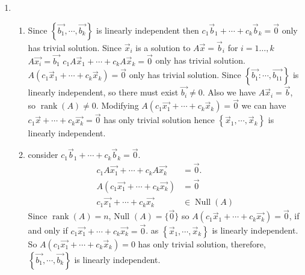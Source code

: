 \documentclass[11pt]{article}
\begin{document}
\begin{enumerate}[{\bf Q1.}]
		\item
		\begin{enumerate}
			\item 
			Since $\left\{\overrightarrow{b_1}, \cdots, \overrightarrow{b_k}\right\}$ is linearly independent then $c_1 \vec{b}_1+\cdots+c_k \vec{b}_k=\overrightarrow{0}$ only has trivial solution. Since $\vec{x}_i$ is a solution to $A \vec{x}=\vec{b}_i$ for $i=1 \ldots, k$ $A \overrightarrow{x_i}=\overrightarrow{b_1}$ \newline
			$c_1 A \vec{x}_1+\cdots+c_k A \vec{x}_k=\overrightarrow{0}$ only has trivial solution. \newline
			$A\left(c_1 \vec{x}_1+\cdots+c_k \vec{x}_k\right)=\overrightarrow{0}$ only has trivial solution. \newline
			Since $\left\{\overrightarrow{b_1}: \cdots, \overrightarrow{b_{11}}\right\}$ is linearly independent,
			so there must exist $\overrightarrow{b_i} \neq 0$. \newline
			Also we have $A \vec{x}_i=\vec{b}$, so $\operatorname{rank}(A) \neq 0$. \newline
			Modifying $A\left(c_1 \overrightarrow{x_1}+\cdots+c_k \vec{x}_k\right)=\overrightarrow{0}$ we can have
			$c_1 \vec{x}+\cdots+c_k \overrightarrow{x_k}=\overrightarrow{0}$ has only trivial solution \newline
			hence $\left\{\vec{x}_1, \cdots, \vec{x}_k\right\}$ is linearly independent.
			\item 
			consider $c_1 \vec{b}_1+\cdots+c_k \vec{b}_k=\overrightarrow{0}$.
			$$
			\begin{aligned}
			c_1 A \overrightarrow{x_1}+\cdots+c_k A \overrightarrow{x_k} & =\overrightarrow{0} . \\
			A\left(c_1 \overrightarrow{x_1}+\cdots+c_k \overrightarrow{x_k}\right) & =\overrightarrow{0} \\
			c_1 \overrightarrow{x_1}+\cdots+c_k \overrightarrow{x_k} & \in \operatorname{Null}(A)
			\end{aligned}
			$$
			Since $\operatorname{rank}(A)=n$, Null $(A)=\{\overrightarrow{0}\}$ \newline
			so $A\left(c_1 \vec{x}_1+\cdots+c_k \overrightarrow{x_k}\right)=\overrightarrow{0}$, if and only if $c_1 \overrightarrow{x_1}+\cdots+c_{k} \overrightarrow{x_{k}}=\overrightarrow{0}$.
			as $\left\{\vec{x}_1, \cdots, \vec{x}_k\right\}$ is linearly independent. \newline
			So $A\left(c_1 \overrightarrow{x_1}+\cdots+c_k \vec{x}_k\right)=0$ has only trivial solution, therefore, $\left\{\overrightarrow{b_1}, \cdots, \overrightarrow{b_k}\right\}$ is linearly independent.
		\end{enumerate}
	\end{enumerate}
\end{document}
